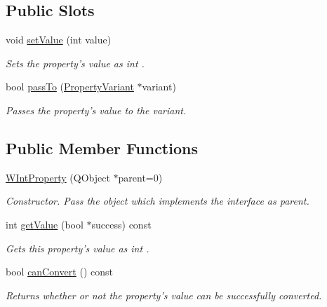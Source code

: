 \subsection*{Public Slots}
\begin{DoxyCompactItemize}
\item 
void \hyperlink{class_w_int_property_a799b26a1c6622fd70068deed73547f6a}{set\-Value} (int value)
\begin{DoxyCompactList}\small\item\em Sets the property's value as int . \end{DoxyCompactList}\item 
bool \hyperlink{class_w_int_property_a92a1f77aac38b9660537122ed55c5e0b}{pass\-To} (\hyperlink{class_property_variant}{Property\-Variant} $\ast$variant)
\begin{DoxyCompactList}\small\item\em Passes the property's value to the variant. \end{DoxyCompactList}\end{DoxyCompactItemize}
\subsection*{Public Member Functions}
\begin{DoxyCompactItemize}
\item 
\hyperlink{class_w_int_property_a5d3ce207add6e3a5f3868010cf9f37e1}{W\-Int\-Property} (Q\-Object $\ast$parent=0)
\begin{DoxyCompactList}\small\item\em Constructor. Pass the object which implements the interface as parent. \end{DoxyCompactList}\item 
int \hyperlink{class_w_int_property_aea678a96a398024ac3cdcdb31e5999de}{get\-Value} (bool $\ast$success) const 
\begin{DoxyCompactList}\small\item\em Gets this property's value as int . \end{DoxyCompactList}\item 
bool \hyperlink{class_w_int_property_a2aadf339189421871abccd98b553ce6b}{can\-Convert} () const 
\begin{DoxyCompactList}\small\item\em Returns whether or not the property's value can be successfully converted. \end{DoxyCompactList}\end{DoxyCompactItemize}
